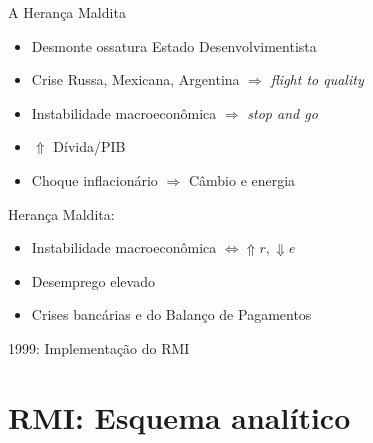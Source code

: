 \documentclass[presentation]{beamer}
\begin{document}
\begin{frame}[label={sec:org0da0e70}]{A Herança Maldita \cite{belluzzoDepoisQuedaEconomia2002}}
\begin{itemize}
\item Desmonte ossatura Estado Desenvolvimentista
\item Crise Russa, Mexicana, Argentina \(\Rightarrow\) \emph{flight to quality}
\item Instabilidade macroeconômica \(\Rightarrow\) \emph{stop and go}
\item \(\Uparrow\) Dívida/PIB
\item Choque inflacionário \(\Rightarrow\) Câmbio e energia
\end{itemize}

\alert{Herança Maldita:}

\begin{itemize}
\item Instabilidade macroeconômica \(\Leftrightarrow \Uparrow r, \Downarrow e\)
\item Desemprego elevado
\item Crises bancárias e do Balanço de Pagamentos
\end{itemize}

\begin{block}{1999: Implementação do RMI}
\end{block}
\end{frame}

\section{RMI: Esquema analítico}
\label{sec:org2924f96}
\end{document}
